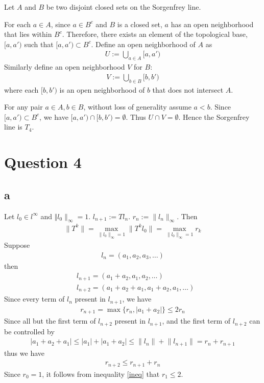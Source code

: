 \documentclass{article}
\begin{document}
Let $A$ and $B$ be two disjoint closed sets on the Sorgenfrey line. 

For each $a\in A$, since $a\in B^c$ and $B$ is a closed set, $a$ has an open neighborhood that lies within $B^c$. Therefore, there exists an element of the topological base, $[a,a')$ such that $[a,a')\subset B^c$. Define an open neighborhood of $A$ as
\begin{align*}
	U:=\bigcup_{a\in A}[a,a') 
	\end{align*}
Similarly define an open neighborhood $V$ for $B$:
\begin{align*}
	V:=\bigcup_{b\in B}[b,b')
\end{align*}
where each $[b,b')$ is an open neighborhood of $b$ that does not intersect $A$.

For any pair $a\in A, b\in B$, without loss of generality assume $a<b$. 
Since $[a,a') \subset B^c$, we have $[a,a')\cap [b,b')=\emptyset$. Thus $U\cap V=\emptyset$. Hence the Sorgenfrey line is $T_4$.




\section*{Question 4}
\subsection*{a}
Let $l_0\in l^\infty$ and $\Vert l_0 \rVert_\infty=1$. $l_{n+1}:=Tl_n$. $r_n:=\lVert l_n\rVert_\infty$. Then
\begin{align*}
	\lVert T^k  \rVert = \max_{\lVert l_0\rVert_\infty=1}\lVert T^k l_0 \rVert = \max_{\lVert l_0 \rVert_\infty=1}r_k
\end{align*}
Suppose 
\begin{align*}
	l_n=(a_1,a_2,a_3,\dots) 
\end{align*}
then
\begin{align*}
	&l_{n+1}=(a_1+a_2,a_1,a_2,\dots) \\
	&l_{n+2}=(a_1+a_2+a_1,a_1+a_2,a_1,\dots)
\end{align*}
Since every term of $l_n$ present in $l_{n+1}$, we have 
\begin{align}
	r_{n+1}= \max\{r_n,|a_1+a_2|\}\leq 2r_{n} \label{ineq}
\end{align}
Since all but the first term of $l_{n+2}$ present in $l_{n+1}$, and the first term of $l_{n+2}$ can be controlled by 
\begin{align*}
	|a_1+a_2+a_1|\leq |a_1|+|a_1+a_2|\leq \lVert l_n\rVert +\lVert l_{n+1}\rVert=r_n+r_{n+1}
\end{align*}
thus we have 
\begin{align}
	r_{n+2}\leq r_{n+1}+r_n \label{ineq2}
\end{align}
Since $r_0=1$, it follows from inequality \ref{ineq} that $r_1\leq 2$. 
\end{document}

